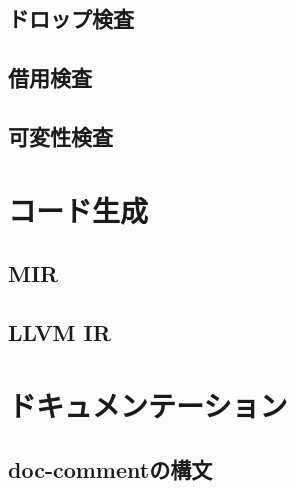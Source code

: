 \documentclass[dvipdfmx,uplatex,papersize,a4paper,10pt]{jsbook}
\theoremstyle{definition}
\begin{document}
\section{ドロップ検査}

\section{借用検査}

\section{可変性検査}



\chapter{コード生成}

\section{MIR}

\section{LLVM IR}



\chapter{ドキュメンテーション}

\section{doc-commentの構文}





\end{document}
